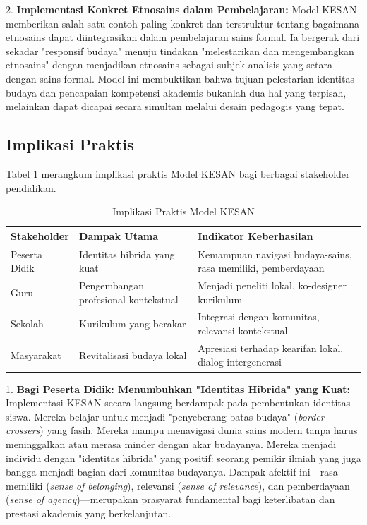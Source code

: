 \documentclass[12pt,a4paper,oneside]{book}
\begin{document}
2.  \textbf{Implementasi Konkret Etnosains dalam Pembelajaran:}
Model KESAN memberikan salah satu contoh paling konkret dan terstruktur tentang bagaimana etnosains dapat diintegrasikan dalam pembelajaran sains formal. Ia bergerak dari sekadar "responsif budaya" menuju tindakan "melestarikan dan mengembangkan etnosains" dengan menjadikan etnosains sebagai subjek analisis yang setara dengan sains formal. Model ini membuktikan bahwa tujuan pelestarian identitas budaya dan pencapaian kompetensi akademis bukanlah dua hal yang terpisah, melainkan dapat dicapai secara simultan melalui desain pedagogis yang tepat.

\subsection{Implikasi Praktis}

Tabel \ref{tab:implikasi_praktis} merangkum implikasi praktis Model KESAN bagi berbagai stakeholder pendidikan.

\begin{table}[H]
\centering
\caption{Implikasi Praktis Model KESAN}
\label{tab:implikasi_praktis}
\begin{tabular}{|p{3cm}|p{5cm}|p{6cm}|}
\hline
\textbf{Stakeholder} & \textbf{Dampak Utama} & \textbf{Indikator Keberhasilan} \\
\hline
Peserta Didik & Identitas hibrida yang kuat & Kemampuan navigasi budaya-sains, rasa memiliki, pemberdayaan \\
\hline
Guru & Pengembangan profesional kontekstual & Menjadi peneliti lokal, ko-designer kurikulum \\
\hline
Sekolah & Kurikulum yang berakar & Integrasi dengan komunitas, relevansi kontekstual \\
\hline
Masyarakat & Revitalisasi budaya lokal & Apresiasi terhadap kearifan lokal, dialog intergenerasi \\
\hline
\end{tabular}
\end{table}

1.  \textbf{Bagi Peserta Didik: Menumbuhkan "Identitas Hibrida" yang Kuat:}
    Implementasi KESAN secara langsung berdampak pada pembentukan identitas siswa. Mereka belajar untuk menjadi "penyeberang batas budaya" (\textit{border crossers}) yang fasih. Mereka mampu menavigasi dunia sains modern tanpa harus meninggalkan atau merasa minder dengan akar budayanya. Mereka menjadi individu dengan "identitas hibrida" yang positif: seorang pemikir ilmiah yang juga bangga menjadi bagian dari komunitas budayanya. Dampak afektif ini—rasa memiliki (\textit{sense of belonging}), relevansi (\textit{sense of relevance}), dan pemberdayaan (\textit{sense of agency})—merupakan prasyarat fundamental bagi keterlibatan dan prestasi akademis yang berkelanjutan.
\end{document}
